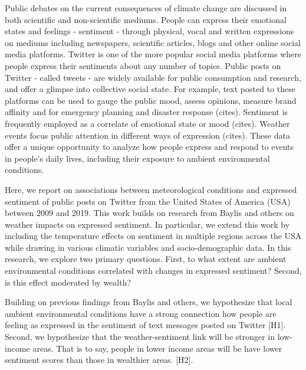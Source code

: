 \documentclass{article}
\begin{document}
Public debates on the current consequences of climate change are discussed in both scientific and non-scientific mediums. 
People can express their emotional states and feelings - sentiment - through physical, vocal and written expressions on mediums including newspapers, scientific articles, blogs and other online social media platforms. Twitter is one of the more popular social media platforms where people express their sentiments about any number of topics. Public posts on Twitter - called tweets - are widely available for public consumption and research, and offer a glimpse into collective social state. For example, text posted to these platforms can be used to gauge the public mood, assess opinions, measure brand affinity and for emergency planning and disaster response (cites). 
Sentiment is frequently employed as a correlate of emotional state or mood (cites). Weather events focus public attention in different ways of expression (cites). These data offer a unique opportunity to analyze how people express and respond to events in people's daily lives, including their exposure to ambient environmental conditions.



Here, we report on associations between meteorological conditions and expressed sentiment of public posts on Twitter from the United States of America (USA) between 2009 and 2019. This work builds on research from Baylis and others \cite{baylis_weather_2018} on weather impacts on expressed sentiment. In particular, we extend this work by including the temperature effects on sentiment in multiple regions across the USA while drawing in various climatic variables and socio-demographic data. In this research, we explore two primary questions. First, to what extent are ambient environmental conditions correlated with changes in expressed sentiment? Second, is this effect moderated by wealth?

Building on previous findings from Baylis and others, we hypothesize that local ambient environmental conditions have a strong connection how people are feeling as expressed in the sentiment of text messages posted on Twitter [H1]. Second, we hypothesize that the weather-sentiment link will be stronger in low-income areas. That is to say, people in lower income areas will be have lower sentiment scores than those in wealthier areas. [H2].
\end{document}
